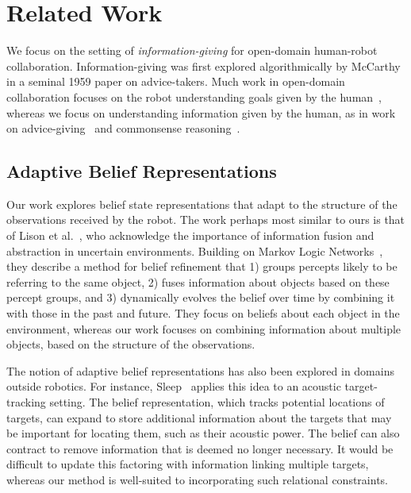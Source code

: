 \section{Related Work}
We focus on the setting of \emph{information-giving} for open-domain
human-robot collaboration. Information-giving was first explored
algorithmically by McCarthy~\cite{programswithcommonsense} in a
seminal 1959 paper on advice-takers. Much work in open-domain
collaboration focuses on the robot understanding goals given by the
human~\cite{talamadupula1}, whereas we focus on understanding
information given by the human, as in work on
advice-giving~\cite{odom2015learning} and commonsense
reasoning~\cite{corpp}.

\subsection{Adaptive Belief Representations}
Our work explores belief state representations that adapt to the
structure of the observations received by the robot. The work perhaps
most similar to ours is that of Lison et
al.~\cite{beliefsituationaware}, who acknowledge the importance of
information fusion and abstraction in uncertain environments. Building
on Markov Logic Networks~\cite{mln}, they describe a method for belief
refinement that 1) groups percepts likely to be referring to the same
object, 2) fuses information about objects based on these percept
groups, and 3) dynamically evolves the belief over time by combining
it with those in the past and future. They focus on beliefs about each
object in the environment, whereas our work focuses on combining
information about multiple objects, based on the structure of the
observations.

The notion of adaptive belief representations has also been explored
in domains outside robotics. For instance, Sleep~\cite{adaptivegrid}
applies this idea to an acoustic target-tracking setting. The belief
representation, which tracks potential locations of targets, can
expand to store additional information about the targets that may be
important for locating them, such as their acoustic power. The belief
can also contract to remove information that is deemed no longer
necessary. It would be difficult to update this factoring with
information linking multiple targets, whereas our method is
well-suited to incorporating such relational constraints.

